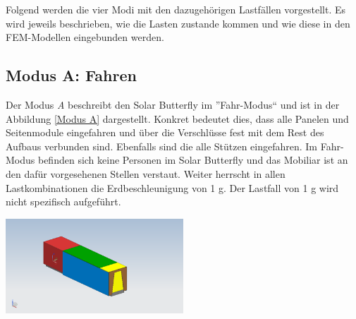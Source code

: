 Folgend werden die vier Modi mit den dazugehörigen Lastfällen vorgestellt. Es wird jeweils beschrieben, wie die Lasten zustande kommen und wie diese in den FEM-Modellen eingebunden werden.

\subsection{Modus A: Fahren}
Der Modus \emph{A} beschreibt den Solar Butterfly im ''Fahr-Modus`` und ist in der Abbildung \ref{Modus A} dargestellt. Konkret bedeutet dies, dass alle Panelen und Seitenmodule eingefahren und über die Verschlüsse fest mit dem Rest des Aufbaus verbunden sind. Ebenfalls sind die alle Stützen eingefahren. Im Fahr-Modus befinden sich keine Personen im Solar Butterfly und das Mobiliar ist an den dafür vorgesehenen Stellen verstaut. Weiter herrscht in allen Lastkombinationen die Erdbeschleunigung von 1 g. Der Lastfall von 1 g wird nicht spezifisch aufgeführt.

\begin{center}
  \includegraphics[width=0.5\textwidth]{04_Figures/A.png}
  \label{Modus A}
\end{center}

